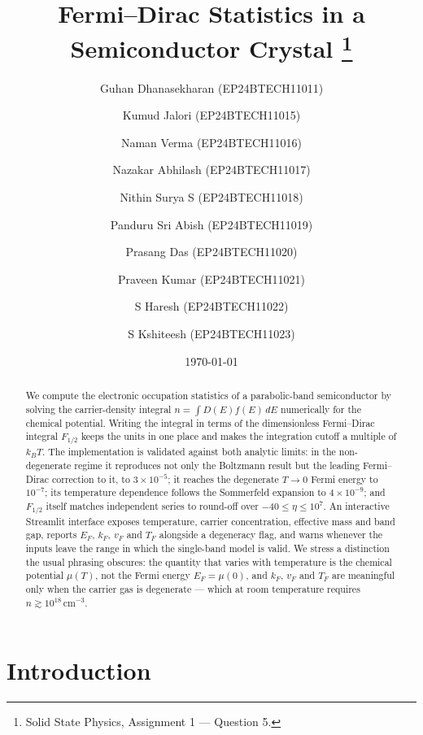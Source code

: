 \documentclass[aps,prb,reprint,nofootinbib]{revtex4-2}
\begin{document}
\title{Fermi--Dirac Statistics in a Semiconductor Crystal%
\thanks{Solid State Physics, Assignment 1 --- Question 5.}}

\author{Guhan Dhanasekharan\,\,(EP24BTECH11011)}
\author{Kumud Jalori\,\,(EP24BTECH11015)}
\author{Naman Verma\,\,(EP24BTECH11016)}
\author{Nazakar Abhilash\,\,(EP24BTECH11017)}
\author{Nithin Surya S\,\,(EP24BTECH11018)}
\author{Panduru Sri Abish\,\,(EP24BTECH11019)}
\author{Prasang Das\,\,(EP24BTECH11020)}
\author{Praveen Kumar\,\,(EP24BTECH11021)}
\author{S Haresh\,\,(EP24BTECH11022)}
\author{S Kshiteesh\,\,(EP24BTECH11023)}

\date{\today}

\begin{abstract}
We compute the electronic occupation statistics of a parabolic-band semiconductor by solving the
carrier-density integral $n=\int D(E)f(E)\,dE$ numerically for the chemical potential. Writing
the integral in terms of the dimensionless Fermi--Dirac integral $F_{1/2}$ keeps the units in one
place and makes the integration cutoff a multiple of $k_BT$. The implementation is validated
against both analytic limits: in the non-degenerate regime it reproduces not only the
Boltzmann result but the leading Fermi--Dirac correction to it, to $3\times10^{-5}$; it reaches
the degenerate $T\to0$ Fermi energy to $10^{-7}$; its temperature dependence follows the
Sommerfeld expansion to $4\times10^{-9}$; and $F_{1/2}$ itself matches independent series to
round-off over $-40\le\eta\le10^{7}$. An interactive Streamlit
interface exposes temperature, carrier concentration, effective mass and band gap, reports
$E_F$, $k_F$, $v_F$ and $T_F$ alongside a degeneracy flag, and warns whenever the inputs leave
the range in which the single-band model is valid. We stress a distinction the usual
phrasing obscures: the quantity that varies with temperature is the chemical potential
$\mu(T)$, not the Fermi energy $E_F=\mu(0)$, and $k_F$, $v_F$ and $T_F$ are meaningful only
when the carrier gas is degenerate --- which at room temperature requires
$n \gtrsim 10^{18}\,$cm$^{-3}$.
\end{abstract}

\maketitle

\section{Introduction}
\end{document}
